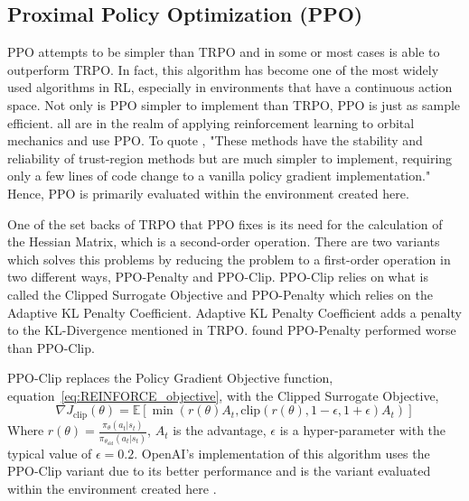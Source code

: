 \subsection{Proximal Policy Optimization (PPO)}

PPO attempts to be simpler than TRPO and in some or most cases is able to outperform TRPO. In fact, this algorithm has become one of the most widely used algorithms in RL, especially in environments that have a continuous action space. Not only is PPO simpler to implement than TRPO, PPO is just as sample efficient. \cite{broida2019spacecraft, lillicrap_hunt_pritzel_heess_erez_tassa_silver_wierstra_2015, oestreich2020autonomous} all are in the realm of applying reinforcement learning to orbital mechanics and use PPO. To quote \cite{schulman_wolski_dharwal_radford_klimov_2017}, "These methods have the stability and reliability of trust-region methods but are much simpler to implement, requiring only a few lines of code change to a vanilla policy gradient implementation." Hence, PPO is primarily evaluated within the environment created here.

One of the set backs of TRPO that PPO fixes is its need for the calculation of the Hessian Matrix, which is a second-order operation. There are two variants which solves this problems by reducing the problem to a first-order operation in two different ways, PPO-Penalty and PPO-Clip. PPO-Clip relies on what is called the Clipped Surrogate Objective and PPO-Penalty which relies on the Adaptive KL Penalty Coefficient. Adaptive KL Penalty Coefficient adds a penalty to the KL-Divergence mentioned in TRPO. \cite{schulman_wolski_dharwal_radford_klimov_2017} found PPO-Penalty performed worse than PPO-Clip.

PPO-Clip replaces the Policy Gradient Objective function, equation~\ref{eq:REINFORCE_objective}, with the Clipped Surrogate Objective, \begin{equation}\label{eq:PPO_clip_objective}
	\nabla J_{\text{clip}}(\theta)=\mathbb{E}[\min (r(\theta)A_t, \text{clip}(r(\theta), 1-\epsilon, 1+\epsilon) A_t)]
\end{equation} Where $r(\theta)=\frac{\pi_\theta (a_t|s_t)}{\pi_{\theta_{\text{old}}}(a_t|s_t)}$, $A_t$ is the advantage, $\epsilon$ is a hyper-parameter with the typical value of $\epsilon=0.2$. OpenAI's implementation of this algorithm uses the PPO-Clip variant due to its better performance and is the variant evaluated within the environment created here \cite{achiam_2020}.

